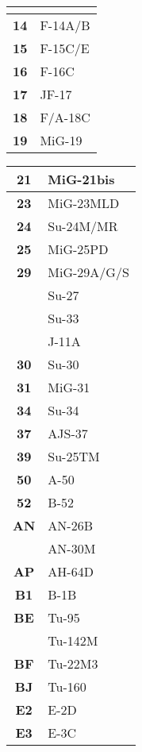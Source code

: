 \documentclass[fontMetropolis]{TechCheck}
\begin{document}
\begin{multicols*}{2}
\begin{center}
\begin{tabular}{c | p{4cm} }
			\midrule
			\multicolumn{2}{c}{\blue{AIRCRAFT}} \\
			\toprule
			\textbf{14} & F-14A/B \\
			\midrule
			\textbf{15} & F-15C/E \\
			\midrule
			\textbf{16} & F-16C \\
			\midrule
			\textbf{17} & JF-17 \\
			\midrule
			\textbf{18} & F/A-18C \\
			\midrule
			\textbf{19} & MiG-19 \\
			\midrule
		\end{tabular}
	\end{center}
	\begin{center}
		\begin{tabular}{c | p{4cm}}
			\textbf{21} & MiG-21bis \\
			\midrule
			\textbf{23} & MiG-23MLD \\
			\midrule
			\textbf{24} & Su-24M/MR \\
			\midrule
			\textbf{25} & MiG-25PD \\
			\midrule
			\textbf{29} & MiG-29A/G/S \\
			& Su-27 \\
			& Su-33 \\
			& J-11A \\
			\midrule
			\textbf{30} & Su-30 \\
			\midrule
			\textbf{31} & MiG-31 \\
			\midrule
			\textbf{34} & Su-34 \\
			\midrule
			\textbf{37} & AJS-37 \\
			\midrule
			\textbf{39} & Su-25TM \\
			\midrule
			\textbf{50} & A-50 \\
			\midrule
			\textbf{52} & B-52 \\
			\midrule
			\textbf{AN} & AN-26B \\
			& AN-30M \\
			\midrule
			\textbf{AP} & AH-64D \\
			\midrule
			\textbf{B1} & B-1B \\
			\midrule
			\textbf{BE} & Tu-95 \\
			& Tu-142M \\
			\midrule
			\textbf{BF} & Tu-22M3 \\
			\midrule
			\textbf{BJ} & Tu-160 \\
			\midrule
			\textbf{E2} & E-2D \\
			\midrule
			\textbf{E3} & E-3C \\

\end{tabular}
\end{center}
\end{multicols*}
\end{document}
